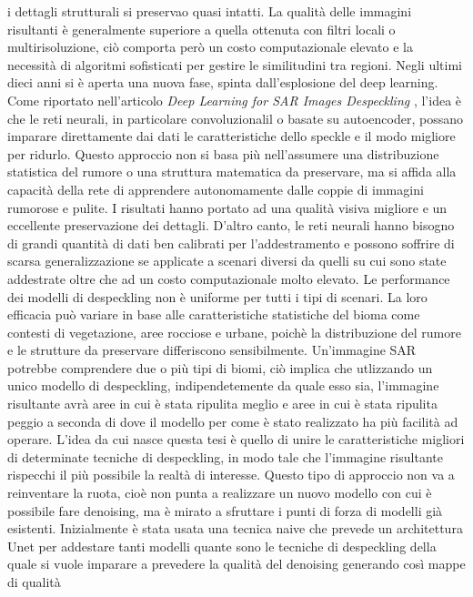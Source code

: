 i dettagli strutturali si preservao quasi intatti. La qualità delle immagini risultanti è generalmente
superiore a quella ottenuta con filtri locali o multirisoluzione, ciò comporta però un costo computazionale elevato 
e la necessità di algoritmi sofisticati per gestire le similitudini tra regioni. Negli ultimi dieci 
anni si è aperta una nuova fase, spinta dall'esplosione del deep learning. Come riportato nell'articolo 
\textit{Deep Learning for SAR Images Despeckling} \cite{DL_SAR}, l'idea è che le reti neurali, in 
particolare convoluzionalil o basate su autoencoder, possano imparare direttamente dai dati le caratteristiche
dello speckle e il modo migliore per ridurlo. Questo approccio non si basa più nell'assumere una distribuzione 
statistica del rumore o una struttura matematica da preservare, ma si affida alla capacità della rete di 
apprendere autonomamente dalle coppie di immagini rumorose e pulite. I risultati hanno portato ad una qualità 
visiva migliore e un eccellente preservazione dei dettagli. D'altro canto, le reti neurali hanno bisogno 
di grandi quantità di dati ben calibrati per l'addestramento e possono soffrire di scarsa generalizzazione se 
applicate a scenari diversi da quelli su cui sono state addestrate oltre che ad un costo computazionale molto elevato. 
Le performance dei modelli di despeckling non è uniforme per tutti i tipi di scenari. La loro efficacia può variare
in base alle caratteristiche statistiche del bioma come contesti di vegetazione, aree rocciose e urbane, 
poichè la distribuzione del rumore e le strutture da preservare differiscono sensibilmente. Un'immagine SAR potrebbe 
comprendere due o più tipi di biomi, ciò implica che utlizzando un unico modello di despeckling, 
indipendetemente da quale esso sia, l'immagine risultante avrà aree in cui è stata ripulita meglio e aree in cui è 
stata ripulita peggio a seconda di dove il modello per come è stato realizzato ha più facilità ad operare.
L'idea da cui nasce questa tesi è quello di unire le caratteristiche migliori di determinate tecniche di despeckling, 
in modo tale che l'immagine risultante rispecchi il più possibile la realtà di interesse. Questo tipo di approccio non va a 
reinventare la ruota, cioè non punta a realizzare un nuovo modello con cui è possibile fare denoising, ma è mirato
a sfruttare i punti di forza di modelli già esistenti. Inizialmente è stata usata una tecnica naive che 
prevede un architettura Unet per addestare tanti modelli quante sono le tecniche di despeckling 
della quale si vuole imparare a prevedere la qualità del denoising generando così mappe di qualità 
